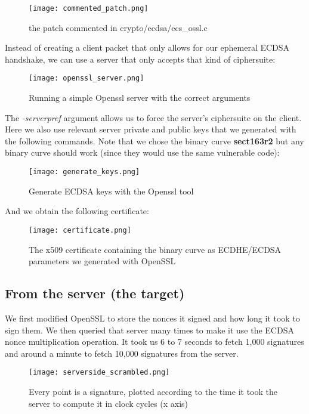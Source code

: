 \documentclass[a4paper,11pt]{article}
\begin{document}
\begin{figure}[H]
\texttt{[image: commented\_patch.png]}
\caption{the patch commented in crypto/ecdsa/ecs\_ossl.c}
\end{figure}

Instead of creating a client packet that only allows for our ephemeral ECDSA handshake, we can use a server that only accepts that kind of ciphersuite:

\begin{figure}[H]
\texttt{[image: openssl\_server.png]}
\caption{Running a simple Openssl server with the correct arguments}
\end{figure}

The \textit{-serverpref} argument allows us to force the server's ciphersuite on the client. Here we also use relevant server private and public keys that we generated with the following commands. Note that we chose the binary curve \textbf{sect163r2} but any binary curve should work (since they would use the same vulnerable code):

\begin{figure}[H]
\texttt{[image: generate\_keys.png]}
\caption{Generate ECDSA keys with the Openssl tool}
\end{figure}

And we obtain the following certificate:

\begin{figure}[H]
\texttt{[image: certificate.png]}
\caption{The x509 certificate containing the binary curve as ECDHE/ECDSA parameters we generated with OpenSSL}
\end{figure}


\subsection{From the server (the target)}

We first modified OpenSSL to store the nonces it signed and how long it took to sign them. We then queried that server many times to make it use the ECDSA nonce multiplication operation. It took us 6 to 7 seconds to fetch 1,000 signatures and around a minute to fetch 10,000 signatures from the server.

\begin{figure}[H]
\texttt{[image: serverside\_scrambled.png]}
\caption{Every point is a signature, plotted according to the time it took the server to compute it in clock cycles (x axis)}
\end{figure}
\end{document}
